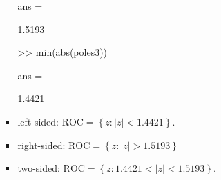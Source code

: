 \documentclass[onecolumn,oneside]{SUSTechHomework}
\begin{document}
\begin{itemize}
\begin{itemize}
\begin{itemize}
\begin{commandline}
    ans =
    
        1.5193
    
    >> min(abs(poles3))
    
    ans =
    
        1.4421
\end{commandline}
            \item left-sided:  $\text{ROC}=\left\{z:|z|<1.4421\right\}$.
            \item right-sided: $\text{ROC}=\left\{z:|z|>1.5193\right\}$ 
            \item two-sided: $\text{ROC}=\left\{z:1.4421<|z|<1.5193\right\}$.
        \end{itemize}
    \end{itemize}
\end{itemize}
\end{document}
